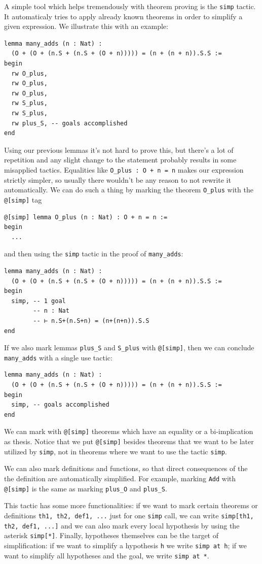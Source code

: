 \documentclass{book}
\theoremstyle{definition}
\theoremstyle{remark}
\theoremstyle{plain}
\begin{document}
A simple tool which helps tremendously with theorem proving is the \lstinline{simp} tactic.
It automaticaly tries to apply already known theorems in order to simplify a given expression.
We illustrate this with an example:
\begin{lstlisting}
lemma many_adds (n : Nat) :
  (O + (O + (n.S + (n.S + (O + n))))) = (n + (n + n)).S.S :=
begin
  rw O_plus,
  rw O_plus,
  rw O_plus,
  rw S_plus,
  rw S_plus,
  rw plus_S, -- goals accomplished
end
\end{lstlisting}
Using our previous lemmas it's not hard to prove this,
but there's a lot of repetition and any slight change to the statement probably results in some misapplied tactics.
Equalities like \lstinline{O_plus : O + n = n} makes our expression strictly simpler,
so usually there wouldn't be any reason to not rewrite it automatically.
We can do such a thing by marking the theorem \lstinline{O_plus} with the \lstinline{@[simp]} tag
\begin{lstlisting}
@[simp] lemma O_plus (n : Nat) : O + n = n :=
begin
  ...  
\end{lstlisting}
and then using the \lstinline{simp} tactic in the proof of \lstinline{many_adds}:
\begin{lstlisting}
lemma many_adds (n : Nat) :
  (O + (O + (n.S + (n.S + (O + n))))) = (n + (n + n)).S.S :=
begin
  simp, -- 1 goal
        -- n : Nat
        -- ⊢ n.S+(n.S+n) = (n+(n+n)).S.S
end
\end{lstlisting}
If we also mark lemmas \lstinline{plus_S} and \lstinline{S_plus} with \lstinline{@[simp]},
then we can conclude \lstinline{many_adds} with a single use tactic:
\begin{lstlisting}
lemma many_adds (n : Nat) :
  (O + (O + (n.S + (n.S + (O + n))))) = (n + (n + n)).S.S :=
begin
  simp, -- goals accomplished
end  
\end{lstlisting}
We can mark with \lstinline{@[simp]} theorems which have an equality or a bi-implication as thesis.
Notice that we put \lstinline{@[simp]} besides theorems that we want to be later utilized by \lstinline{simp},
not in theorems where we want to use the tactic \lstinline{simp}.

We can also mark definitions and functions,
so that direct consequences of the the definition are automatically simplified.
For example, marking \lstinline{Add} with \lstinline{@[simp]} is the same as marking \lstinline{plus_O} and \lstinline{plus_S}. 

This tactic has some more functionalities: if we want to mark certain theorems or definitions \lstinline{th1, th2, def1, ...}
just for one \lstinline{simp} call, we can write \lstinline{simp[th1, th2, def1, ...]} and we can also mark every local hypothesis
by using the asterisk \lstinline{simp[*]}.
Finally, hypotheses themselves can be the target of simplification:
if we want to simplify a hypothesis \lstinline{h} we write \lstinline{simp at h};
if we want to simplify all hypotheses and the goal, we write \lstinline{simp at *}.
\end{document}
